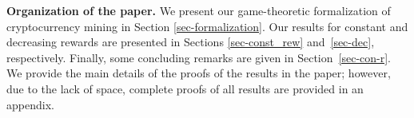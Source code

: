 
\smallskip
\noindent
{\bf Organization of the paper.} We present our game-theoretic formalization of cryptocurrency mining in Section \ref{sec-formalization}. Our results for constant and decreasing rewards are presented in Sections \ref{sec-const_rew} and~\ref{sec-dec}, respectively. Finally, some concluding remarks are given in Section~\ref{sec-con-r}. We provide the main details of the proofs of the results in the paper; however, due to the lack of space, complete proofs of all results are provided in an appendix.




